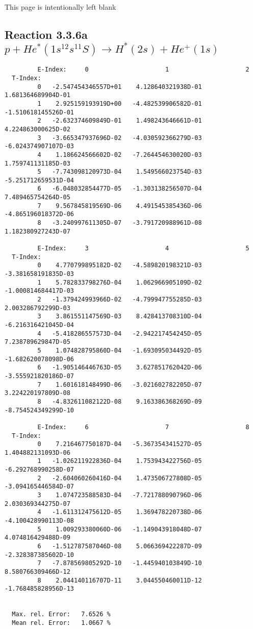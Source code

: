 \documentclass[12pt,dvipdfmx]{article}
\begin{document}
\newpage
This page is intentionally left blank
\newpage
\subsection{
Reaction 3.3.6a  $ p + He^*(1s^12s^11S) \rightarrow H^*(2s) + He^+(1s) $
}


\begin{small}\begin{verbatim}
         E-Index:     0                     1                     2
  T-Index:
         0   -2.547454346557D+01    4.128640321938D-01    1.681364689904D-01
         1    2.925159193919D+00   -4.482539906582D-01   -1.510618145526D-01
         2   -2.632374609849D-01    1.498243646661D-01    4.224863000625D-02
         3   -3.665347937696D-02   -4.030592366279D-03   -6.024374907107D-03
         4    1.186624566602D-02   -7.264454630020D-03    1.759741131185D-03
         5   -7.743098120973D-04    1.549566023754D-03   -5.251712659531D-04
         6   -6.048032854477D-05   -1.303138256507D-04    7.489465754264D-05
         7    9.567845819569D-06    4.491545385436D-06   -4.865196018372D-06
         8   -3.240997611305D-07   -3.791720988961D-08    1.182380927243D-07

         E-Index:     3                     4                     5
  T-Index:
         0    4.770799895182D-02   -4.589820198321D-03   -3.381658191835D-03
         1    5.782833798276D-04    1.062966905109D-02   -1.000814684417D-03
         2   -1.379424993966D-02   -4.799947755285D-03    2.003286792299D-03
         3    3.861551147569D-03    8.428413708310D-04   -6.216316421045D-04
         4   -5.418286557573D-04   -2.942217454245D-05    7.238789629847D-05
         5    1.074828795860D-04   -1.693095034492D-05   -1.682620078098D-06
         6   -1.905146446763D-05    3.627851762042D-06   -3.555921820186D-07
         7    1.601618148499D-06   -3.021602782205D-07    3.224220197809D-08
         8   -4.832611082122D-08    9.163386368269D-09   -8.754524349299D-10

         E-Index:     6                     7                     8
  T-Index:
         0    7.216467750187D-04   -5.367354341527D-05    1.404882131093D-06
         1   -1.026211922836D-04    1.753943422756D-05   -6.292768990258D-07
         2   -2.604060260416D-04    1.473506727808D-05   -3.094165446584D-07
         3    1.074723588583D-04   -7.721788090796D-06    2.030369344275D-07
         4   -1.611312475612D-05    1.369478220738D-06   -4.100428990113D-08
         5    1.009293380060D-06   -1.149043918048D-07    4.074816429488D-09
         6   -1.512787587046D-08    5.066369422287D-09   -2.328387385602D-10
         7   -7.878569805292D-10   -1.445940103849D-10    8.580766309466D-12
         8    2.044140116707D-11    3.044550460011D-12   -1.768485828956D-13


  Max. rel. Error:   7.6526 %
  Mean rel. Error:   1.0667 %
\end{verbatim}\end{small}
\end{document}
